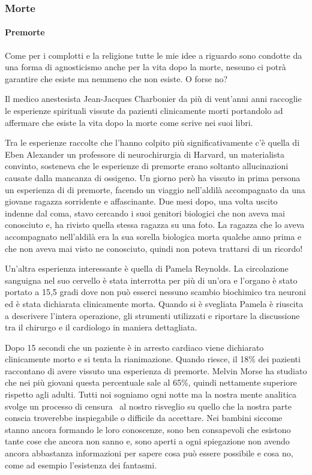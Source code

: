 \documentclass[12pt]{book} %
\begin{document}
\subsubsection{Morte }
\paragraph{Premorte}
Come per i complotti e la religione tutte le mie idee a riguardo sono condotte da una forma di agnosticismo anche per la
vita dopo la morte, nessuno ci potrà garantire che esiste ma nemmeno che non esiste. O forse no? 

Il medico anestesista Jean-Jacques Charbonier da più di vent'anni anni raccoglie le esperienze
spirituali vissute da pazienti clinicamente morti portandolo ad affermare che esiste la vita dopo la morte come scrive
nei suoi
libri.

Tra le esperienze raccolte che l'hanno colpito più significativamente c'è quella di Eben Alexander un professore di
neurochirurgia di Harvard, un materialista convinto, sosteneva che le esperienze di premorte erano soltanto
allucinazioni causate dalla mancanza di ossigeno. Un giorno però ha vissuto in prima persona un esperienza di di
premorte, facendo un viaggio nell'aldilà accompagnato da una giovane ragazza sorridente e affascinante. Due mesi dopo,
una volta uscito indenne dal coma, stavo cercando i suoi genitori biologici che non aveva mai conosciuto e, ha rivisto
quella stessa ragazza su una foto. La ragazza che lo aveva accompagnato nell'aldilà era la sua sorella biologica morta
qualche anno prima e che non aveva mai visto ne conosciuto, quindi non poteva trattarsi di un ricordo!


\bigskip

Un'altra esperienza interessante è quella di Pamela Reynolds. La circolazione sanguigna nel suo cervello è stata
interrotta per più di un'ora e l'organo è stato portato a 15,5 gradi dove non può esserci nessuno scambio biochimico
tra neuroni ed è stata dichiarata clinicamente morta. Quando si è svegliata Pamela è riuscita a descrivere l'intera
operazione, gli strumenti utilizzati e riportare la discussione tra il chirurgo e il cardiologo in maniera dettagliata.



\bigskip

Dopo 15 secondi che un paziente è in arresto cardiaco viene dichiarato clinicamente morto e si tenta la rianimazione.
Quando riesce, il 18\% dei pazienti raccontano di avere vissuto una esperienza di premorte. Melvin Morse ha studiato
che nei più giovani questa percentuale sale al 65\%, quindi nettamente superiore rispetto agli adulti. Tutti noi
sogniamo ogni notte ma la nostra mente analitica svolge un processo di censura \ al nostro risveglio su quello che la
nostra parte conscia troverebbe inspiegabile o difficile da accettare. Nei bambini siccome stanno ancora formando le
loro conoscenze, sono ben consapevoli che esistono tante cose che ancora non sanno e, sono aperti a ogni spiegazione
non avendo ancora abbastanza informazioni per sapere cosa può essere possibile e cosa no, come ad esempio l'esistenza
dei fantasmi.
\end{document}
